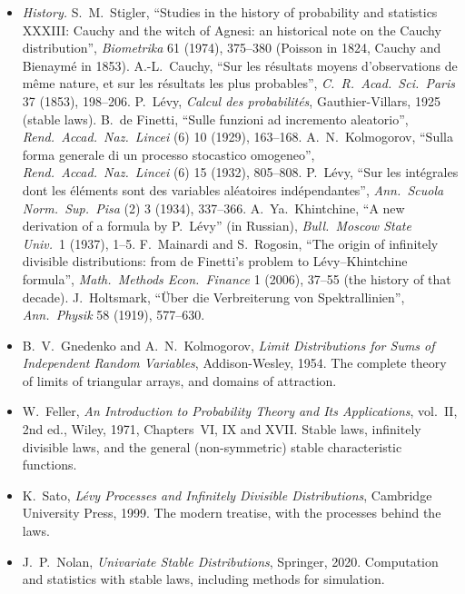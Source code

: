 \begin{itemize}
\item \emph{History.} S.~M.~Stigler, ``Studies in the history of probability and statistics XXXIII: Cauchy and the witch of Agnesi: an historical note on the
Cauchy distribution'', \emph{Biometrika} 61 (1974), 375--380 (Poisson in 1824, Cauchy and Bienaym\'e in 1853). A.-L.~Cauchy, ``Sur les r\'esultats moyens
d'observations de m\^eme nature, et sur les r\'esultats les plus probables'', \emph{C.\ R.\ Acad.\ Sci.\ Paris} 37 (1853), 198--206. P.~L\'evy, \emph{Calcul des
probabilit\'es}, Gauthier-Villars, 1925 (stable laws). B.~de Finetti, ``Sulle funzioni ad incremento aleatorio'', \emph{Rend.\ Accad.\ Naz.\ Lincei} (6) 10 (1929),
163--168. A.~N.~Kolmogorov, ``Sulla forma generale di un processo stocastico omogeneo'', \emph{Rend.\ Accad.\ Naz.\ Lincei} (6) 15 (1932), 805--808. P.~L\'evy, ``Sur
les int\'egrales dont les \'el\'ements sont des variables al\'eatoires ind\'ependantes'', \emph{Ann.\ Scuola Norm.\ Sup.\ Pisa} (2) 3 (1934), 337--366. A.~Ya.~Khintchine,
``A new derivation of a formula by P.~L\'evy'' (in Russian), \emph{Bull.\ Moscow State Univ.}\ 1 (1937), 1--5. F.~Mainardi and S.~Rogosin, ``The origin of infinitely
divisible distributions: from de Finetti's problem to L\'evy--Khintchine formula'', \emph{Math.\ Methods Econ.\ Finance} 1 (2006), 37--55 (the history of that decade).
J.~Holtsmark, ``\"Uber die Verbreiterung von Spektrallinien'', \emph{Ann.\ Physik} 58 (1919), 577--630.
\item B.~V.~Gnedenko and A.~N.~Kolmogorov, \emph{Limit Distributions for Sums of Independent Random Variables}, Addison-Wesley, 1954. The complete theory of
limits of triangular arrays, and domains of attraction.
\item W.~Feller, \emph{An Introduction to Probability Theory and Its Applications}, vol.~II, 2nd ed., Wiley, 1971, Chapters~VI, IX and XVII. Stable laws, infinitely divisible laws,
and the general (non-symmetric) stable characteristic functions.
\item K.~Sato, \emph{L\'evy Processes and Infinitely Divisible Distributions}, Cambridge University Press, 1999. The modern treatise, with the processes behind the laws.
\item J.~P.~Nolan, \emph{Univariate Stable Distributions}, Springer, 2020. Computation and statistics with stable laws, including methods for simulation.
\end{itemize}
